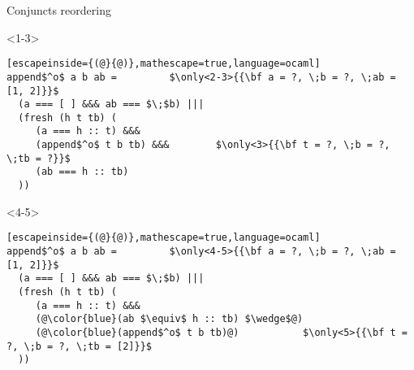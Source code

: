 \documentclass{beamer}
\theoremstyle{definition}
\theoremstyle{plain} %
\begin{document}
\begin{frame}[fragile]{Conjuncts reordering}

\begin{onlyenv}<1-3>
\begin{lstlisting}[escapeinside={(@}{@)},mathescape=true,language=ocaml]
append$^o$ a b ab =			$\only<2-3>{{\bf a = ?, \;b = ?, \;ab = [1, 2]}}$
  (a === [ ] &&& ab === $\;$b) |||
  (fresh (h t tb) (
     (a === h :: t) &&&
     (append$^o$ t b tb) &&&		$\only<3>{{\bf t = ?, \;b = ?, \;tb = ?}}$
     (ab === h :: tb)  
  ))
 \end{lstlisting}
 \end{onlyenv}
 \begin{onlyenv}<4-5>
\begin{lstlisting}[escapeinside={(@}{@)},mathescape=true,language=ocaml]
append$^o$ a b ab =			$\only<4-5>{{\bf a = ?, \;b = ?, \;ab = [1, 2]}}$
  (a === [ ] &&& ab === $\;$b) |||
  (fresh (h t tb) (
     (a === h :: t) &&&
     (@\color{blue}(ab $\equiv$ h :: tb) $\wedge$@)
     (@\color{blue}(append$^o$ t b tb)@)		   $\only<5>{{\bf t = ?, \;b = ?, \;tb = [2]}}$
  ))
 \end{lstlisting}
 \end{onlyenv}

\end{frame}
\end{document}
